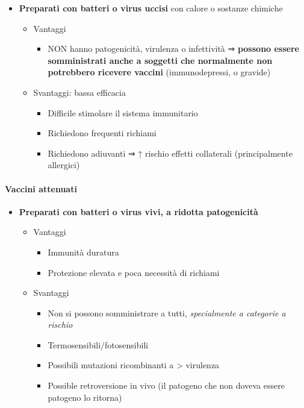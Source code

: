 \documentclass[italian,]{article}
\providecommand{\tightlist}{%
  \setlength{\itemsep}{0pt}\setlength{\parskip}{0pt}}
\begin{document}
\begin{itemize}
\tightlist
\item
  \textbf{Preparati con batteri o virus uccisi} con calore o sostanze
  chimiche

  \begin{itemize}
  \tightlist
  \item
    Vantaggi

    \begin{itemize}
    \tightlist
    \item
      NON hanno patogenicità, virulenza o infettività ⇒ \textbf{possono
      essere somministrati anche a soggetti che normalmente non
      potrebbero ricevere vaccini} (immunodepressi, o gravide)
    \end{itemize}
  \item
    Svantaggi: bassa efficacia

    \begin{itemize}
    \tightlist
    \item
      Difficile stimolare il sistema immunitario
    \item
      Richiedono frequenti richiami
    \item
      Richiedono adiuvanti ⇒ ↑ rischio effetti collaterali
      (principalmente allergici)
    \end{itemize}
  \end{itemize}
\end{itemize}

\hypertarget{vaccini-attenuati}{%
\paragraph{Vaccini attenuati}\label{vaccini-attenuati}}

\begin{itemize}
\tightlist
\item
  \textbf{Preparati con batteri o virus vivi, a ridotta patogenicità}

  \begin{itemize}
  \tightlist
  \item
    Vantaggi

    \begin{itemize}
    \tightlist
    \item
      Immunità duratura
    \item
      Protezione elevata e poca necessità di richiami
    \end{itemize}
  \item
    Svantaggi

    \begin{itemize}
    \tightlist
    \item
      Non si possono somministrare a tutti, \emph{specialmente a
      categorie a rischio}
    \item
      Termosensibili/fotosensibili
    \item
      Possibili mutazioni ricombinanti a \textgreater{} virulenza
    \item
      Possible retroversione in vivo (il patogeno che non doveva essere
      patogeno lo ritorna)
    \end{itemize}
  \end{itemize}
\end{itemize}
\end{document}

